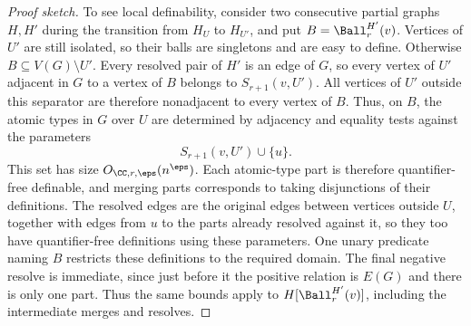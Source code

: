 \begin{proof}[Proof sketch]
To see local definability, consider two consecutive partial graphs $H,H'$ during the transition from $H_U$ to $H_{U'}$, and put $B=\Ball^{H'}_r(v)$.
Vertices of $U'$ are still isolated, so their balls are singletons and are easy to define.
Otherwise $B\subseteq V(G)\setminus U'$. Every resolved pair of $H'$ is an edge of $G$, so every vertex of $U'$ adjacent in $G$ to a vertex of $B$ belongs to $S_{r+1}(v,U')$.
All vertices of $U'$ outside this separator are therefore nonadjacent to every vertex of $B$.
Thus, on $B$, the atomic types in $G$ over $U$ are determined by adjacency and equality tests against the parameters
\[
S_{r+1}(v,U')\cup\{u\}.
\]
This set has size $O_{\CC,r,\eps}(n^\eps)$.
Each atomic-type part is therefore quantifier-free definable, and merging parts corresponds to taking disjunctions of their definitions.
The resolved edges are the original edges between vertices outside $U$, together with edges from $u$ to the parts already resolved against it, so they too have quantifier-free definitions using these parameters.
One unary predicate naming $B$ restricts these definitions to the required domain.
The final negative resolve is immediate, since just before it the positive relation is $E(G)$ and there is only one part.
Thus the same bounds apply to $H[\Ball^{H'}_r(v)]$, including the intermediate merges and resolves.
\end{proof}
